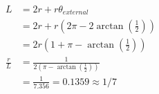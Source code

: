 \documentclass[12pt]{article}
\begin{document}
\begin{align*}
L &= 2r + r\theta_{external} \\
  &= 2r + r\left(2\pi - 2\arctan\left(\frac{1}{2}\right)\right) \\
  &= 2r\left(1 + \pi - \arctan\left(\frac{1}{2}\right)\right) \\ 
\frac{r}{L} &= \frac{1}{2\left(\pi - \arctan\left(\frac{1}{2}\right)\right)} \\
            &= \frac{1}{7.356} = 0.1359 \approx 1/7
\end{align*}
\end{document}
